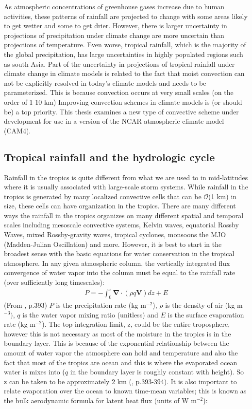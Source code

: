 \documentclass[letterpaper,12pt,titlepage,oneside,final]{book}
\begin{document}
As atmospheric concentrations of greenhouse gases increase due to human activities, these patterns of rainfall are projected to change with some areas likely to get wetter and some to get drier. However, there is larger uncertainty in projections of precipitation under climate change are more uncertain than projections of temperature. Even worse, tropical rainfall, which is the majority of the global precipitation, has large uncertainties in highly populated regions such as south Asia. Part of the uncertainty in projections of tropical rainfall under climate change in climate models is related to the fact that moist convection can not be explicitly resolved in today's climate models and needs to be parameterized. This is because convection occurs at very small scales (on the order of 1-10 km) Improving convection schemes in climate models is (or should be) a top priority. This thesis examines a new type of convective scheme under development for use in a version of the NCAR atmospheric climate model (CAM4).
\subsection{Tropical rainfall and the hydrologic cycle}\label{hydro}
Rainfall in the tropics is quite different from what we are used to in mid-latitudes where it is usually associated with large-scale storm systems. While rainfall in the tropics is generated by many localized convective cells that can be $\mathcal{O}$(1 km) in size, these cells can have organization in the tropics. There are many different ways the rainfall in the tropics organizes on many different spatial and temporal scales including mesoscale convective systems, Kelvin waves, equatorial Rossby Waves, mixed Rossby-gravity waves, tropical cyclones, monsoons the MJO (Madden-Julian Oscillation) and more. However, it is best to start in the broadest sense with the basic equations for water conservation in the tropical atmosphere. In any given atmospheric column, the vertically integrated flux convergence of water vapor into the column must be equal to the rainfall rate (over sufficiently long timescales):
\begin{align}
P=-\int_{0}^{z}\mathbf{\nabla}\cdot(\rho{q}\mathbf{V})dz+E
\end{align}
(From \citep{holton_introduction_2004}, p.393)
$P$ is the precipitation rate (kg m$^{-2}$), $\rho$ is the density of air (kg m$^{-3})$, $q$ is the water vapor mixing ratio (unitless) and $E$ is the surface evaporation rate (kg m$^{-2}$). The top integration limit, z, could be the entire troposphere, however this is not necessary as most of the moisture in the tropics is in the boundary layer. This is because of the exponential relationship between the amount of water vapor the atmosphere can hold and temperature and also the fact that most of the tropics are ocean and this is where the evaporated ocean water is mixes into ($q$ in the boundary layer is roughly constant with height). So z can be taken to be approximately 2 km (\citep{holton_introduction_2004}, p.393-394). It is also important to relate evaporation over the ocean to known time-mean variables; this is known as the bulk aerodynamic formula for latent heat flux (units of W m$^{-2}$):
\end{document}
